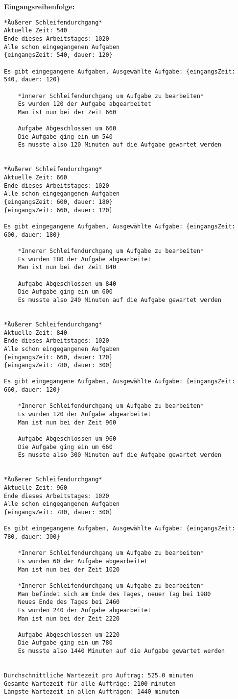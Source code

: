 \documentclass[a4paper,10pt,ngerman]{scrartcl}
\begin{document}
\textbf{Eingangsreihenfolge:}
\begin{lstlisting}[numbers=none]
*Äußerer Schleifendurchgang*
Aktuelle Zeit: 540
Ende dieses Arbeitstages: 1020
Alle schon eingegangenen Aufgaben
{eingangsZeit: 540, dauer: 120}

Es gibt eingegangene Aufgaben, Ausgewählte Aufgabe: {eingangsZeit: 540, dauer: 120}

    *Innerer Schleifendurchgang um Aufgabe zu bearbeiten*
    Es wurden 120 der Aufgabe abgearbeitet
    Man ist nun bei der Zeit 660

    Aufgabe Abgeschlossen um 660
    Die Aufgabe ging ein um 540
    Es musste also 120 Minuten auf die Aufgabe gewartet werden


*Äußerer Schleifendurchgang*
Aktuelle Zeit: 660
Ende dieses Arbeitstages: 1020
Alle schon eingegangenen Aufgaben
{eingangsZeit: 600, dauer: 180}
{eingangsZeit: 660, dauer: 120}

Es gibt eingegangene Aufgaben, Ausgewählte Aufgabe: {eingangsZeit: 600, dauer: 180}

    *Innerer Schleifendurchgang um Aufgabe zu bearbeiten*
    Es wurden 180 der Aufgabe abgearbeitet
    Man ist nun bei der Zeit 840

    Aufgabe Abgeschlossen um 840
    Die Aufgabe ging ein um 600
    Es musste also 240 Minuten auf die Aufgabe gewartet werden


*Äußerer Schleifendurchgang*
Aktuelle Zeit: 840
Ende dieses Arbeitstages: 1020
Alle schon eingegangenen Aufgaben
{eingangsZeit: 660, dauer: 120}
{eingangsZeit: 780, dauer: 300}

Es gibt eingegangene Aufgaben, Ausgewählte Aufgabe: {eingangsZeit: 660, dauer: 120}

    *Innerer Schleifendurchgang um Aufgabe zu bearbeiten*
    Es wurden 120 der Aufgabe abgearbeitet
    Man ist nun bei der Zeit 960

    Aufgabe Abgeschlossen um 960
    Die Aufgabe ging ein um 660
    Es musste also 300 Minuten auf die Aufgabe gewartet werden


*Äußerer Schleifendurchgang*
Aktuelle Zeit: 960
Ende dieses Arbeitstages: 1020
Alle schon eingegangenen Aufgaben
{eingangsZeit: 780, dauer: 300}

Es gibt eingegangene Aufgaben, Ausgewählte Aufgabe: {eingangsZeit: 780, dauer: 300}

    *Innerer Schleifendurchgang um Aufgabe zu bearbeiten*
    Es wurden 60 der Aufgabe abgearbeitet
    Man ist nun bei der Zeit 1020

    *Innerer Schleifendurchgang um Aufgabe zu bearbeiten*
    Man befindet sich am Ende des Tages, neuer Tag bei 1980
    Neues Ende des Tages bei 2460
    Es wurden 240 der Aufgabe abgearbeitet
    Man ist nun bei der Zeit 2220

    Aufgabe Abgeschlossen um 2220
    Die Aufgabe ging ein um 780
    Es musste also 1440 Minuten auf die Aufgabe gewartet werden


Durchschnittliche Wartezeit pro Auftrag: 525.0 minuten
Gesamte Wartezeit für alle Aufträge: 2100 minuten
Längste Wartezeit in allen Aufträgen: 1440 minuten
\end{lstlisting}
\end{document}
